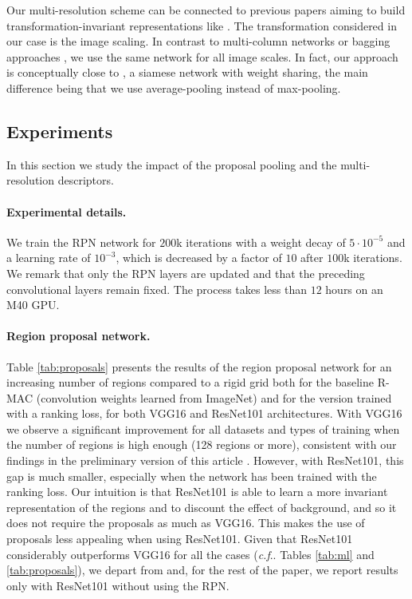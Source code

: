 \documentclass[twocolumn]{svjour3}          \smartqed  \usepackage{graphicx}
\makeatletter
\DeclareRobustCommand\onedot{\futurelet\@let@token\@onedot}
\def\@onedot{\ifx\@let@token.\else.\null\fi\xspace}
\def\cf{\emph{c.f}\onedot} \def\Cf{\emph{C.f}\onedot}
\makeatother
\begin{document}
Our multi-resolution scheme can be connected to previous papers aiming to build transformation-invariant representations like \cite{a,b}. The transformation considered in our case is the image scaling. In contrast to multi-column networks or bagging approaches \citep{a}, we use the same network for all image scales. In fact, our approach is conceptually close to \cite{b}, a siamese network with weight sharing, the main difference being that we use average-pooling instead of max-pooling.



\subsection{Experiments}

In this section we study the impact of the proposal pooling and the multi-resolution descriptors.

\paragraph{Experimental details.}
We train the RPN network for $200$k iterations with a weight decay of $5\cdot 10^{-5}$ and a learning rate of $10^{-3}$, which is decreased by a factor of $10$ after $100$k iterations.
We remark that only the RPN layers are updated and that the preceding convolutional layers remain fixed. 
The process takes less than $12$ hours on an M40 GPU.

\paragraph{Region proposal network.}

Table \ref{tab:proposals} presents the results of the region proposal network for an increasing number of regions compared to a rigid grid both for the baseline R-MAC (convolution weights learned from ImageNet) and for the version trained with a ranking loss, for both VGG16 and ResNet101 architectures.
With VGG16 we observe a significant improvement for all datasets and types of training when the number of regions is high enough (128 regions or more), consistent with our findings in the preliminary version of this article \citep{gordo2016deep}. 
However, with ResNet101, this gap is much smaller, especially when the network has been trained with the ranking loss.
Our intuition is that ResNet101 is able to learn a more invariant representation of the regions and to discount the effect of background, and so it does not require the proposals as much as VGG16. This makes the use of proposals less appealing when using ResNet101.
Given that ResNet101 considerably outperforms VGG16 for all the cases (\cf Tables \ref{tab:ml} and \ref{tab:proposals}), we depart from \cite{gordo2016deep} and, for the rest of the paper, we report results only with ResNet101 without using the RPN.
\end{document}
